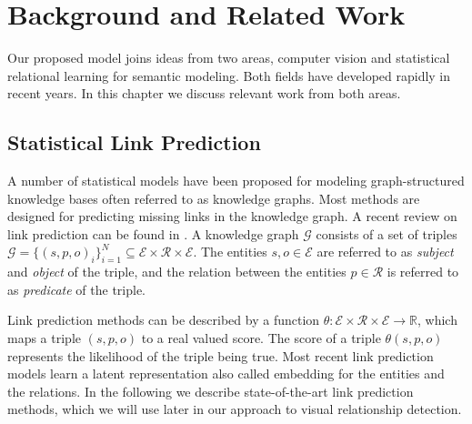 \documentclass[runningheads,a4paper]{llncs}
\begin{document}
%

%
%
%
%



\section{Background and Related Work}
\label{section_related_work}

Our proposed model joins ideas from two areas, computer vision and statistical relational learning for semantic modeling. Both fields have developed rapidly in recent years. In this chapter we discuss relevant work from both areas.

\subsection{Statistical Link Prediction}
\label{section_related_work_link_prediction}
A number of statistical models have been proposed for modeling graph-structured knowledge bases often referred to as knowledge graphs. Most methods are designed for predicting missing links in the knowledge graph. A recent review on link prediction can be found in \cite{relational_review}. A knowledge graph $\mathcal{G}$ consists of a set of triples $\mathcal{G} = \{(s, p, o)_i\}_{i=1}^N \subseteq \mathcal{E} \times \mathcal{R} \times \mathcal{E}$. The entities $s, o \in \mathcal{E}$ are referred to as \textit{subject} and \textit{object} of the triple, and the relation between the entities $p \in \mathcal{R}$ is referred to as \textit{predicate} of the triple.

Link prediction methods can be described by a function $\theta: \mathcal{E} \times \mathcal{R} \times \mathcal{E} \rightarrow \mathbb{R}$, which maps a triple $(s,p,o)$ to a real valued score. The score of a triple $\theta(s,p,o)$ represents the likelihood of the triple being true. Most recent link prediction models learn a latent representation also called embedding for the entities and the relations. In the following we describe state-of-the-art link prediction methods, which we will use later in our approach to visual relationship detection.
\end{document}

